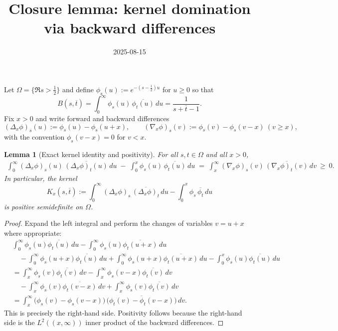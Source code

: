 \documentclass[11pt]{article}
\title{Closure lemma: kernel domination via backward differences}
\date{2025-08-15}
\newtheorem{lemma}{Lemma}
\theoremstyle{remark}
\begin{document}
\maketitle

Let $\Omega=\{\Re s>\tfrac12\}$ and define $\phi_s(u):=e^{-(s-\frac12)u}$ for $u\ge0$ so that
\[B(s,\overline t)=\int_0^\infty \phi_s(u)\,\overline{\phi_t(u)}\,du=\frac{1}{s+\overline t-1}.
\]
Fix $x>0$ and write forward and backward differences
\[ (\Delta_x\phi)_s(u):=\phi_s(u)-\phi_s(u+x),\qquad (\nabla_x\phi)_s(v):=\phi_s(v)-\phi_s(v-x)\ (v\ge x),\]
with the convention $\phi_s(v-x)=0$ for $v<x$.

\begin{lemma}[Exact kernel identity and positivity]\label{lem:backward-diff}
For all $s,t\in\Omega$ and all $x>0$,
\begin{align*}
\int_0^\infty (\Delta_x\phi)_s(u)\,\overline{(\Delta_x\phi)_t(u)}\,du\; -\; \int_0^x \phi_s(u)\,\overline{\phi_t(u)}\,du
\;=\; \int_x^\infty (\nabla_x\phi)_s(v)\,\overline{(\nabla_x\phi)_t(v)}\,dv\ \ge\ 0.
\end{align*}
In particular, the kernel
\[K_x(s,\overline t):=\int_0^\infty (\Delta_x\phi)_s\,\overline{(\Delta_x\phi)_t}\,du - \int_0^x \phi_s\,\overline{\phi_t}\,du\]
is positive semidefinite on $\Omega$.
\end{lemma}

\begin{proof}
Expand the left integral and perform the changes of variables $v=u+x$ where appropriate:
\begin{align*}
&\int_0^\infty \phi_s(u)\overline{\phi_t(u)}\,du - \int_0^\infty \phi_s(u)\overline{\phi_t(u+x)}\,du\\
&\quad-\int_0^\infty \phi_s(u+x)\overline{\phi_t(u)}\,du + \int_0^\infty \phi_s(u+x)\overline{\phi_t(u+x)}\,du - \int_0^x \phi_s(u)\overline{\phi_t(u)}\,du\\
&= \int_x^\infty \phi_s(v)\overline{\phi_t(v)}\,dv - \int_x^\infty \phi_s(v-x)\overline{\phi_t(v)}\,dv \\
&\quad - \int_x^\infty \phi_s(v)\overline{\phi_t(v-x)}\,dv + \int_x^\infty \phi_s(v)\overline{\phi_t(v)}\,dv \\
&= \int_x^\infty \bigl(\phi_s(v)-\phi_s(v-x)\bigr)\,\overline{\bigl(\phi_t(v)-\phi_t(v-x)\bigr)}\,dv.
\end{align*}
This is precisely the right-hand side. Positivity follows because the right-hand side is the $L^2((x,\infty))$ inner product of the backward differences.
\end{proof}
\end{document}
